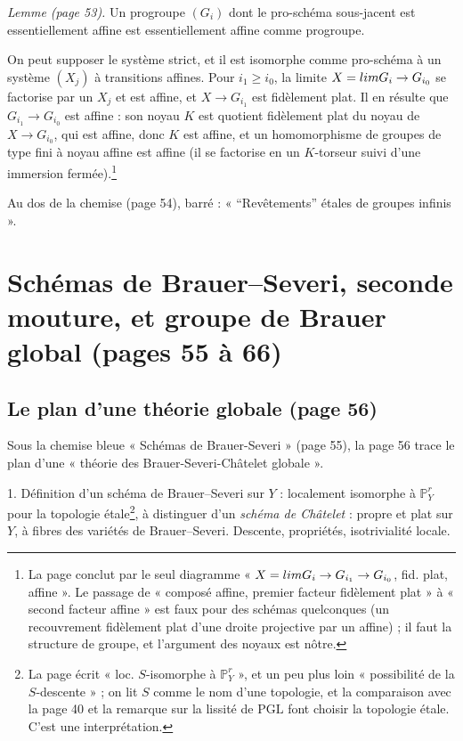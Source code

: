 \documentclass[11pt,a4paper]{article}
\begin{document}
\emph{Lemme (page 53).} Un progroupe $(G_i)$ dont le pro-schéma sous-jacent est
essentiellement affine est essentiellement affine comme progroupe.

On peut supposer le système strict, et il est isomorphe comme pro-schéma à un
système $(X_j)$ à transitions affines. Pour $i_1 \ge i_0$, la limite $X =
\varprojlim G_i \to G_{i_0}$ se factorise par un $X_{j}$ et est affine, et $X
\to G_{i_1}$ est fidèlement plat. Il en résulte que $G_{i_1} \to G_{i_0}$ est
affine : son noyau $K$ est quotient fidèlement plat du noyau de $X \to
G_{i_0}$, qui est affine, donc $K$ est affine, et un homomorphisme de groupes
de type fini à noyau affine est affine (il se factorise en un $K$-torseur suivi
d'une immersion fermée).\footnote{La page conclut par le seul diagramme
« $X = \varprojlim G_i \to G_{i_1} \to G_{i_0}$, fid. plat, affine ». Le passage
de « composé affine, premier facteur fidèlement plat » à « second facteur
affine » est faux pour des schémas quelconques (un recouvrement fidèlement
plat d'une droite projective par un affine) ; il faut la structure de groupe,
et l'argument des noyaux est nôtre.}

Au dos de la chemise (page 54), barré : « “Revêtements” étales de groupes
infinis ».

\section*{Schémas de Brauer–Severi, seconde mouture, et groupe de Brauer global (pages 55 à 66)}

\subsection*{Le plan d'une théorie globale (page 56)}

Sous la chemise bleue « Schémas de Brauer-Severi » (page 55), la page 56
trace le plan d'une « théorie des Brauer-Severi-Châtelet globale ».

1. Définition d'un schéma de Brauer–Severi sur $Y$ : localement isomorphe à
$\mathbb{P}^{r}_Y$ pour la topologie étale\footnote{La page écrit « loc.
$S$-isomorphe à $\mathbb{P}^r_Y$ », et un peu plus loin « possibilité de la
$S$-descente » ; on lit $S$ comme le nom d'une topologie, et la
comparaison avec la page 40 et la remarque sur la lissité de
$\mathrm{PGL}$ font choisir la topologie étale. C'est une interprétation.},
à distinguer d'un \emph{schéma de Châtelet} : propre et plat sur $Y$, à fibres
des variétés de Brauer–Severi. Descente, propriétés, isotrivialité locale.
\end{document}
